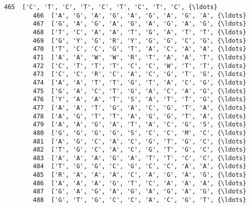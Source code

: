 \documentclass[11pt]{article}
\begin{document}
\begin{Verbatim}[commandchars=\\\{\}]
        465  ['C', 'T', 'C', 'T', 'C', 'T', 'C', 'T', 'C', {\ldots}   
        466  ['A', 'G', 'A', 'G', 'A', 'G', 'A', 'G', 'A', {\ldots}   
        467  ['G', 'A', 'G', 'A', 'G', 'A', 'G', 'A', 'G', {\ldots}   
        468  ['T', 'C', 'A', 'A', 'T', 'G', 'A', 'T', 'T', {\ldots}   
        469  ['G', 'Y', 'G', 'R', 'Y', 'G', 'G', 'C', 'G', {\ldots}   
        470  ['T', 'C', 'C', 'G', 'T', 'A', 'C', 'A', 'A', {\ldots}   
        471  ['A', 'A', 'W', 'W', 'R', 'T', 'A', 'A', 'T', {\ldots}   
        472  ['C', 'T', 'T', 'T', 'C', 'C', 'W', 'T', 'T', {\ldots}   
        473  ['C', 'C', 'R', 'C', 'A', 'C', 'G', 'T', 'G', {\ldots}   
        474  ['A', 'A', 'T', 'T', 'G', 'T', 'A', 'C', 'G', {\ldots}   
        475  ['G', 'A', 'C', 'T', 'G', 'A', 'C', 'A', 'G', {\ldots}   
        476  ['Y', 'A', 'A', 'T', 'S', 'A', 'T', 'T', 'G', {\ldots}   
        477  ['A', 'A', 'T', 'G', 'A', 'C', 'G', 'T', 'A', {\ldots}   
        478  ['A', 'G', 'T', 'T', 'A', 'G', 'G', 'T', 'A', {\ldots}   
        479  ['A', 'A', 'G', 'A', 'T', 'A', 'C', 'G', 'S', {\ldots}   
        480  ['G', 'G', 'G', 'G', 'S', 'C', 'C', 'M', 'C', {\ldots}   
        481  ['A', 'G', 'C', 'A', 'C', 'G', 'T', 'G', 'C', {\ldots}   
        482  ['T', 'G', 'C', 'A', 'C', 'G', 'T', 'G', 'C', {\ldots}   
        483  ['A', 'A', 'A', 'G', 'A', 'T', 'T', 'C', 'C', {\ldots}   
        484  ['T', 'G', 'G', 'C', 'G', 'C', 'C', 'A', 'A', {\ldots}   
        485  ['R', 'A', 'A', 'A', 'C', 'A', 'G', 'A', 'G', {\ldots}   
        486  ['A', 'A', 'A', 'G', 'T', 'C', 'A', 'A', 'A', {\ldots}   
        487  ['G', 'A', 'G', 'A', 'G', 'A', 'G', 'A', 'G', {\ldots}   
        488  ['G', 'T', 'G', 'C', 'C', 'A', 'C', 'G', 'T', {\ldots}   
        

\end{Verbatim}
\end{document}
